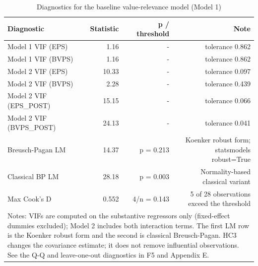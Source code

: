 \begin{table}[htbp]
\centering
\caption{Diagnostics for the baseline value-relevance model (Model 1)}
\label{tab:t6_diagnostics}
\begin{tabular}{lrrr}
\toprule
Diagnostic & Statistic & p / threshold & Note \\
\midrule
Model 1 VIF (EPS) & 1.16 & - & tolerance 0.862 \\
Model 1 VIF (BVPS) & 1.16 & - & tolerance 0.862 \\
Model 2 VIF (EPS) & 10.33 & - & tolerance 0.097 \\
Model 2 VIF (BVPS) & 2.28 & - & tolerance 0.439 \\
Model 2 VIF (EPS\_POST) & 15.15 & - & tolerance 0.066 \\
Model 2 VIF (BVPS\_POST) & 24.13 & - & tolerance 0.041 \\
Breusch-Pagan LM & 14.37 & p = 0.213 & Koenker robust form; statsmodels robust=True \\
Classical BP LM & 28.18 & p = 0.003 & Normality-based classical variant \\
Max Cook's D & 0.552 & 4/n = 0.143 & 5 of 28 observations exceed the threshold \\
\midrule
\multicolumn{4}{l}{\footnotesize Notes: VIFs are computed on the substantive regressors only (fixed-effect dummies excluded); Model 2 includes both interaction terms. The first LM row is the Koenker robust form and the second is classical Breusch-Pagan. HC3 changes the covariance estimate; it does not remove influential observations. See the Q-Q and leave-one-out diagnostics in F5 and Appendix E.} \\
\bottomrule
\end{tabular}
\end{table}
